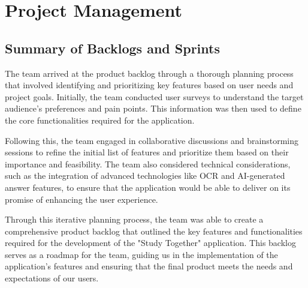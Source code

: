 
\chapter{Project Management}\label{ch:project_management}

\section{Summary of Backlogs and Sprints}

The team arrived at the product backlog through a thorough planning process that involved identifying and prioritizing key features based on user needs and project goals. Initially, the team conducted user surveys to understand the target audience's preferences and pain points. This information was then used to define the core functionalities required for the application.

Following this, the team engaged in collaborative discussions and brainstorming sessions to refine the initial list of features and prioritize them based on their importance and feasibility. The team also considered technical considerations, such as the integration of advanced technologies like OCR and AI-generated answer features, to ensure that the application would be able to deliver on its promise of enhancing the user experience.

Through this iterative planning process, the team was able to create a comprehensive product backlog that outlined the key features and functionalities required for the development of the "Study Together" application. This backlog serves as a roadmap for the team, guiding us in the implementation of the application's features and ensuring that the final product meets the needs and expectations of our users.

